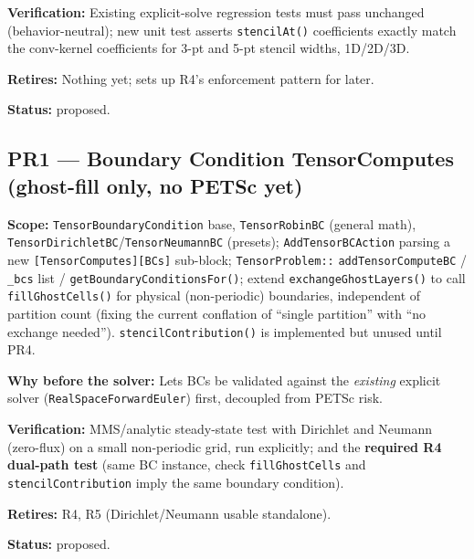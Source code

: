 \documentclass[11pt]{article}
\newcommand{\pr}[2]{\subsection{PR#1 --- #2}}
\newcommand{\status}[1]{\textcolor{marlinteal}{\textbf{Status:}} #1}
\begin{document}
\textbf{Verification:} Existing explicit-solve regression tests must pass
unchanged (behavior-neutral); new unit test asserts \texttt{stencilAt()}
coefficients exactly match the conv-kernel coefficients for 3-pt and 5-pt
stencil widths, 1D/2D/3D.

\textbf{Retires:} Nothing yet; sets up R4's enforcement pattern for later.

\status{proposed.}

\pr{1}{Boundary Condition TensorComputes (ghost-fill only, no PETSc yet)}
\textbf{Scope:} \texttt{TensorBoundaryCondition} base, \texttt{TensorRobinBC}
(general math), \texttt{TensorDirichletBC}/\texttt{TensorNeumannBC}
(presets); \texttt{AddTensorBCAction} parsing a new
\texttt{[TensorComputes][BCs]} sub-block; \texttt{TensorProblem::}
\texttt{addTensorComputeBC} / \texttt{\_bcs} list /
\texttt{getBoundaryConditionsFor()}; extend \texttt{exchangeGhostLayers()}
to call \texttt{fillGhostCells()} for physical (non-periodic) boundaries,
independent of partition count (fixing the current conflation of ``single
partition'' with ``no exchange needed''). \texttt{stencilContribution()} is
implemented but unused until PR4.

\textbf{Why before the solver:} Lets BCs be validated against the
\textit{existing} explicit solver (\texttt{RealSpaceForwardEuler}) first,
decoupled from PETSc risk.

\textbf{Verification:} MMS/analytic steady-state test with Dirichlet and
Neumann (zero-flux) on a small non-periodic grid, run explicitly; and the
\textbf{required R4 dual-path test} (same BC instance, check
\texttt{fillGhostCells} and \texttt{stencilContribution} imply the same
boundary condition).

\textbf{Retires:} R4, R5 (Dirichlet/Neumann usable standalone).

\status{proposed.}
\end{document}
